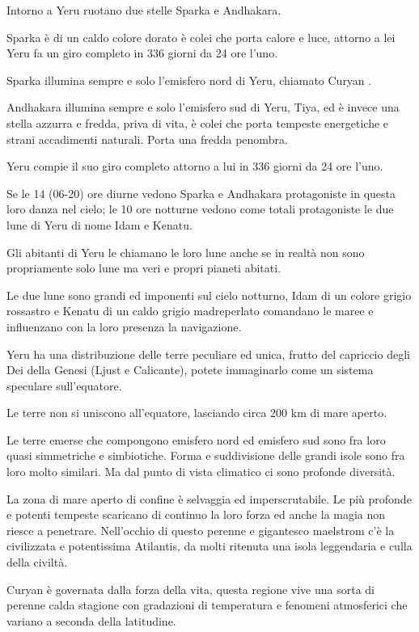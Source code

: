 \documentclass[a4paper,11pt,twoside,openany]{book}
\begin{document}
{Intorno a Yeru ruotano due stelle Sparka e Andhakara.

Sparka è di un caldo colore dorato è colei che porta calore e luce, attorno a lei Yeru fa un giro completo in 336 giorni da 24 ore l'uno. 

Sparka illumina sempre e solo l'emisfero nord di Yeru, chiamato Curyan .

Andhakara illumina sempre e solo l'emisfero sud di Yeru, Tiya, ed è invece una stella azzurra e fredda, priva di vita, è colei che porta tempeste energetiche e strani accadimenti naturali. Porta una fredda penombra.

Yeru compie il suo giro completo attorno a lui in 336 giorni da 24 ore l'uno.

Se le 14 (06-20) ore diurne vedono Sparka e Andhakara protagoniste in questa loro danza nel cielo; le 10 ore notturne vedono come totali protagoniste le due lune di Yeru di nome Idam e Kenatu. 

Gli abitanti di Yeru le chiamano le loro lune anche se in realtà non sono propriamente solo lune ma veri e propri pianeti abitati.

Le due lune sono grandi ed imponenti sul cielo notturno, Idam di un colore grigio rossastro e Kenatu di un caldo grigio madreperlato comandano le maree e influenzano con la loro presenza la navigazione. 

Yeru ha una distribuzione delle terre peculiare ed unica, frutto del capriccio degli Dei della Genesi (Ljust e Calicante), potete immaginarlo come un sistema speculare sull'equatore.

Le terre non si uniscono all'equatore, lasciando circa 200 km di mare aperto.

Le terre emerse che compongono emisfero nord ed emisfero sud sono fra loro quasi simmetriche e simbiotiche. Forma e suddivisione delle grandi isole sono fra loro molto similari. Ma dal punto di vista climatico ci sono profonde diversità.

La zona di mare aperto di confine è selvaggia ed imperscrutabile. Le più profonde e potenti tempeste scaricano di continuo la loro forza ed anche la magia non riesce a penetrare. Nell'occhio di questo perenne e gigantesco maelstrom c'è la civilizzata e potentissima Atilantis, da molti ritenuta una isola leggendaria e culla della civiltà.

Curyan è governata dalla forza della vita, questa regione vive una sorta di perenne calda stagione con gradazioni di temperatura e fenomeni atmosferici che variano a seconda della latitudine.

}
\end{document}
